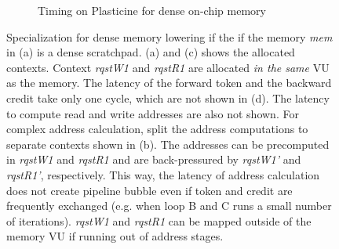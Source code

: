 \begin{figure}
\begin{subfigure}[b]{1\textwidth}
\caption{Timing on Plasticine for dense on-chip memory}
\end{subfigure}
\caption[Dense specialization]{
  Specialization for dense memory lowering if the if the memory \emph{mem} in 
   (a) is a dense scratchpad.
  (a) and (c) shows the allocated contexts.
  Context \emph{rqstW1} and \emph{rqstR1} are allocated \emph{in the same} VU as the memory. The latency of 
  the forward token and the backward credit take only one cycle, which are not shown in (d).
  The latency to compute read and write addresses are also not shown.
  For complex address calculation, \name split the address computations to separate contexts shown
  in (b). The addresses can be precomputed in \emph{rqstW1} and \emph{rqstR1} and are back-pressured by 
  \emph{rqstW1'} and \emph{rqstR1'}, respectively. This way, the latency of address calculation does
  not create pipeline bubble even if token and credit are frequently exchanged (e.g. when loop B and C
  runs a small number of iterations).
  \emph{rqstW1} and \emph{rqstR1} can be mapped outside of the memory VU if running out of address
  stages.
}
\label{fig:densespecial}
\end{figure}

